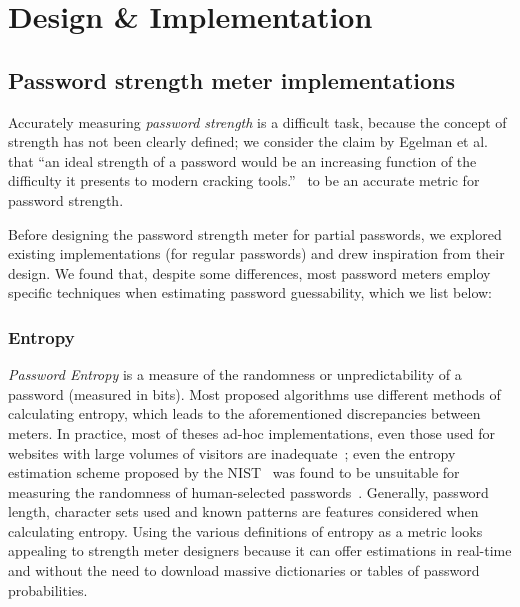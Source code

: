 
\chapter{Design \& Implementation}
\label{cha:design_implementation}

\section{Password strength meter implementations}
  \label{sec:str_meter_existing}
  Accurately measuring \emph{password strength} is a difficult task, because the concept of strength has not been clearly defined; we consider the claim by Egelman et al. that ``an ideal strength of a password would be an increasing function of the difficulty it presents to modern cracking tools.''~\cite{strength_meter_impact} to be an accurate metric for password strength.

  Before designing the password strength meter for partial passwords, we explored existing implementations (for regular passwords) and drew inspiration from their design. We found that, despite some differences, most password meters employ specific techniques when estimating password guessability, which we list below:

  \subsection{Entropy}
    \label{ssec:entropy}
    \emph{Password Entropy} is a measure of the randomness or unpredictability of a password (measured in bits). Most proposed algorithms use different methods of calculating entropy, which leads to the aforementioned discrepancies between meters. In practice, most of theses ad-hoc implementations, even those used for websites with large volumes of visitors are inadequate~\cite{pass_str_meter_analysis,analyzing_pass_str,dropbox_str}; even the entropy estimation scheme proposed by the NIST~\cite{NIST_old} was found to be unsuitable for measuring the randomness of human-selected passwords~\cite{NIST_invalid}. Generally, password length, character sets used and known patterns are features considered when calculating entropy. Using the various definitions of entropy as a metric looks appealing to strength meter designers because it can offer estimations in real-time and without the need to download massive dictionaries or tables of password probabilities.

